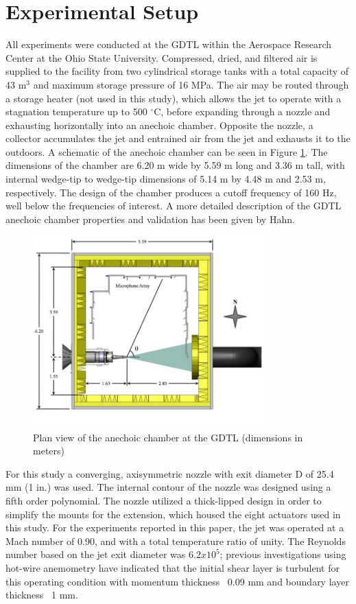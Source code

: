 \documentclass[english]{aiaa-tc}
\begin{document}
\section{Experimental Setup}
All experiments were conducted at the GDTL within the Aerospace Research Center at the Ohio State University. Compressed, dried, and filtered air is supplied to the facility from two cylindrical storage tanks with a total capacity of 43 m$^3$ and maximum storage pressure of 16 MPa. The air may be routed through a storage heater (not used in this study), which allows the jet to operate with a stagnation temperature up to 500 $^\circ$C, before expanding through a nozzle and exhausting horizontally into an anechoic chamber. Opposite the nozzle, a collector accumulates the jet and entrained air from the jet and exhausts it to the outdoors. A schematic of the anechoic chamber can be seen in Figure \ref{GDTLschematic}. The dimensions of the chamber are 6.20 m wide by 5.59 m long and 3.36 m tall, with internal wedge-tip to wedge-tip dimensions of 5.14 m by 4.48 m and 2.53 m, respectively. The design of the chamber produces a cutoff frequency of 160 Hz, well below the frequencies of interest. A more detailed description of the GDTL anechoic chamber properties and validation has been given by Hahn\cite{Hahn2011}.
\begin{figure}
\begin{center}
	\includegraphics[width=3.5in]{GDTL_facility_schematic}
    \caption{Plan view of the anechoic chamber at the GDTL (dimensions in meters)}\label{GDTLschematic}
\end{center}
\end{figure}

For this study a converging, axisymmetric nozzle with exit diameter D of 25.4 mm (1 in.) was used. The internal contour of the nozzle was designed using a fifth order polynomial. The nozzle utilized a thick-lipped design in order to simplify the mounts for the extension, which housed the eight actuators used in this study. For the experiments reported in this paper, the jet was operated at a Mach number of 0.90, and with a total temperature ratio of unity. The Reynolds number based on the jet exit diameter was $6.2x10^5$; previous investigations using hot-wire anemometry have indicated that the initial shear layer is turbulent for this operating condition with momentum thickness ~0.09 mm and boundary layer thickness ~1 mm\cite{kfm2009-1}. 
\end{document}
